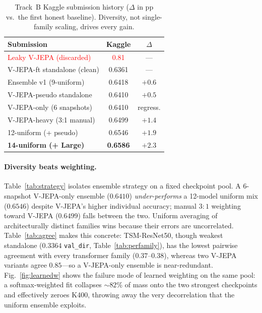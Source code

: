 \documentclass[10pt,twocolumn,letterpaper]{article}
\begin{document}
\begin{table}[t]
\centering\small
\setlength{\tabcolsep}{5pt}
\begin{tabular}{@{}lcc@{}}
\toprule
Submission & Kaggle & $\Delta$ \\
\midrule
\textcolor{red}{Leaky V-JEPA (discarded)} & \textcolor{red}{0.81} & --- \\
V-JEPA-ft standalone (clean)   & 0.6361 & --- \\
Ensemble v1 (9-uniform)        & 0.6418 & $+0.6$ \\
V-JEPA-pseudo standalone       & 0.6410 & $+0.5$ \\
V-JEPA-only (6 snapshots)      & 0.6410 & regress. \\
V-JEPA-heavy (3:1 manual)      & 0.6499 & $+1.4$ \\
12-uniform (+ pseudo)          & 0.6546 & $+1.9$ \\
\textbf{14-uniform (+ Large)}  & \textbf{0.6586} & $+2.3$ \\
\bottomrule
\end{tabular}
\caption{Track~B Kaggle submission history ($\Delta$ in pp vs.\ the first honest
baseline). Diversity, not single-family scaling, drives every gain.}
\label{tab:kaggle}
\end{table}

\paragraph{Diversity beats weighting.}
Table~\ref{tab:strategy} isolates ensemble strategy on a fixed checkpoint pool.
A 6-snapshot V-JEPA-only ensemble ($0.6410$) \emph{under-performs} a 12-model
uniform mix ($0.6546$) despite V-JEPA's higher individual accuracy; manual
$3{:}1$ weighting toward V-JEPA ($0.6499$) falls between the two. Uniform
averaging of architecturally distinct families wins because their errors are
uncorrelated. Table~\ref{tab:agree} makes this concrete: TSM-ResNet50, though
weakest standalone ($0.3364$ \texttt{val\_dir}, Table~\ref{tab:perfamily}), has
the lowest pairwise agreement with every transformer family ($0.37$--$0.38$),
whereas two V-JEPA variants agree $0.85$---so a V-JEPA-only ensemble is
near-redundant. Fig.~\ref{fig:learnedw} shows the failure mode of learned
weighting on the same pool: a softmax-weighted fit collapses ${\sim}82\%$ of
mass onto the two strongest checkpoints and effectively zeroes K400, throwing
away the very decorrelation that the uniform ensemble exploits.
\end{document}
